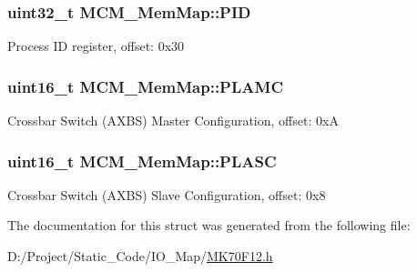 \subsubsection[{P\+I\+D}]{\setlength{\rightskip}{0pt plus 5cm}uint32\+\_\+t M\+C\+M\+\_\+\+Mem\+Map\+::\+P\+I\+D}\label{struct_m_c_m___mem_map_a41b1890f596f706bcd94c2d49c1e44f7}
Process I\+D register, offset\+: 0x30 \hypertarget{struct_m_c_m___mem_map_a7d749b910777a6b67ea94f2379c628ee}{}
\subsubsection[{P\+L\+A\+M\+C}]{\setlength{\rightskip}{0pt plus 5cm}uint16\+\_\+t M\+C\+M\+\_\+\+Mem\+Map\+::\+P\+L\+A\+M\+C}\label{struct_m_c_m___mem_map_a7d749b910777a6b67ea94f2379c628ee}
Crossbar Switch (A\+X\+B\+S) Master Configuration, offset\+: 0x\+A \hypertarget{struct_m_c_m___mem_map_ad68f64d82524bb0b181a837967b8e248}{}
\subsubsection[{P\+L\+A\+S\+C}]{\setlength{\rightskip}{0pt plus 5cm}uint16\+\_\+t M\+C\+M\+\_\+\+Mem\+Map\+::\+P\+L\+A\+S\+C}\label{struct_m_c_m___mem_map_ad68f64d82524bb0b181a837967b8e248}
Crossbar Switch (A\+X\+B\+S) Slave Configuration, offset\+: 0x8 

The documentation for this struct was generated from the following file\+:\begin{DoxyCompactItemize}
\item 
D\+:/\+Project/\+Static\+\_\+\+Code/\+I\+O\+\_\+\+Map/\hyperlink{_m_k70_f12_8h}{M\+K70\+F12.\+h}\end{DoxyCompactItemize}
